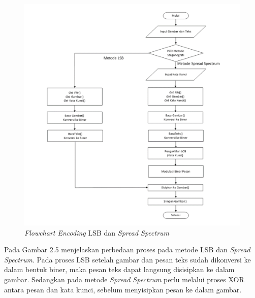 	\begin{figure}[H]
		\centering
		\includegraphics[width=1\textwidth]{gambar/spreadlsb}
		\caption{\emph{Flowchart Encoding} LSB dan \emph{Spread Spectrum}}
		\label{spreadlsb}
	\end{figure}
	
	Pada Gambar 2.5 menjelaskan perbedaan proses pada metode LSB dan \emph{Spread Spectrum}. Pada proses LSB setelah gambar dan pesan teks sudah dikonversi ke dalam bentuk biner, maka pesan teks dapat langsung disisipkan ke dalam gambar. Sedangkan pada metode \emph{Spread Spectrum} perlu melalui proses XOR antara pesan dan kata kunci, sebelum menyisipkan pesan ke dalam gambar.

